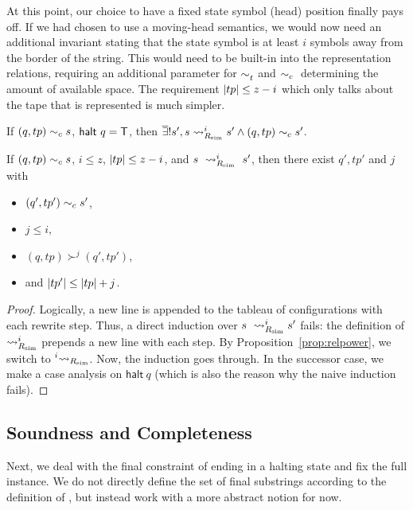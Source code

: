 \begin{remark}
  At this point, our choice to have a fixed state symbol (head) position finally pays off. If we had chosen to use a moving-head semantics, we would now need an additional invariant stating that the state symbol is at least $i$ symbols away from the border of the string. This would need to be built-in into the representation relations, requiring an additional parameter for $\sim_t^{}$ and $\sim_c{}$ determining the amount of available space.
  The requirement $|tp| \le z - i$ which only talks about the tape that is represented is much simpler.
\end{remark}

\begin{lemma}\label{lem:multistep_halt}
  If $(q, tp) \sim_c{} s$, $\textsf{halt}~q = \mathsf{T}$, then $\overline{\exists}! s', s \rightsquigarrow_{R_{\text{sim}}}^i s' \land (q, tp) \sim_c{} s'$. 
\end{lemma}

\begin{lemma}\label{lem:multistep_sound}
  If $(q, tp) \sim_c{} s$, $i \le z$, $|tp| \le z - i$, and $s~\rightsquigarrow_{R_{\text{sim}}}^i~s'$, then there exist $q', tp'$ and $j$ with 
  \begin{itemize}
    \item $(q', tp') \sim_c{} s'$, 
    \item $j \le i$, 
    \item $(q, tp) \succ^j (q', tp')$, 
    \item and $|tp'| \le |tp| + j$.
  \end{itemize}
\end{lemma}
\begin{proof}
  Logically, a new line is appended to the tableau of configurations with each rewrite step. Thus, a direct induction over $s~\rightsquigarrow_{R_{\text{sim}}}^i s'$ fails: the definition of $\rightsquigarrow_{R_{\text{sim}}}^i$ prepends a new line with each step. By Proposition~\ref{prop:relpower}, we switch to $\prescript{i}{}{\rightsquigarrow_{\ensuremath{R_{\text{sim}}}}}$. 
  Now, the induction goes through. In the successor case, we make a case analysis on $\textsf{halt}~q$ (which is also the reason why the naive induction fails).
\end{proof}

\subsection{Soundness and Completeness}
Next, we deal with the final constraint of ending in a halting state and fix the full \PR{} instance.
We do not directly define the set of final substrings according to the definition of \PR{}, but instead work with a more abstract notion for now.

